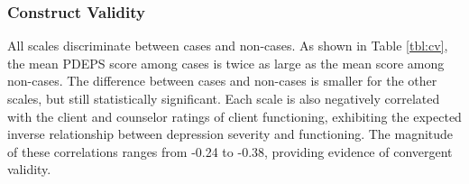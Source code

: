 \documentclass[man,natbib,longtable]{apa6}\usepackage[]{graphicx}\usepackage[]{color}
\begin{document}
\begin{table}
\rotatebox[origin=c]{90}{
  \centerline{\begin{threeparttable}
  \caption{Diagnostic validity}
  \label{tbl:dv}
  \centering
  \begin{tabular}{llllllllllllll}
  \toprule
  & & \multicolumn{6}{c}{DSM-5} & \multicolumn{6}{c}{Local} \\
  \cmidrule(lr){3-8} \cmidrule(lr){9-14}
  Scale & Cut & Sen & Spe & Acc & LRP & LRN & AUC & Sen & Spe & Acc & LRP & LRN & AUC \\
  \midrule
  \textit{Combined, N=193} & & & & & & & & & & & & & \\
  \expandableinput ../../master/output/tables/dv.tex
  \midrule
  \textit{Pregnant, n=61} & & & & & & & & & & & & & \\
  \expandableinput ../../master/output/tables/dvPr.tex
  \midrule
  \textit{Postpartum, n=132} & & & & & & & & & & & & & \\
  \expandableinput ../../master/output/tables/dvPp.tex
  \bottomrule
  \end{tabular}
  \begin{tablenotes}
  \small
  \item Note. Sen=sensitivity. Spe=specificity. Acc=accuracy (1-error rate). LRP=likelihood ratio (positive). LRN=likelihood radio (negative). AUC=area under the receiver operating characteristic curve.
  \end{tablenotes}
  \end{threeparttable}}\hspace{4cm}
}
\end{table}



\subsubsection{Construct Validity}

All scales discriminate between cases and non-cases. As shown in Table \ref{tbl:cv}, the mean PDEPS score among cases is twice as large as the mean score among non-cases. The difference between cases and non-cases is smaller for the other scales, but still statistically significant. Each scale is also negatively correlated with the client and counselor ratings of client functioning, exhibiting the expected inverse relationship between depression severity and functioning. The magnitude of these correlations ranges from -0.24 to -0.38, providing evidence of convergent validity.
\end{document}

